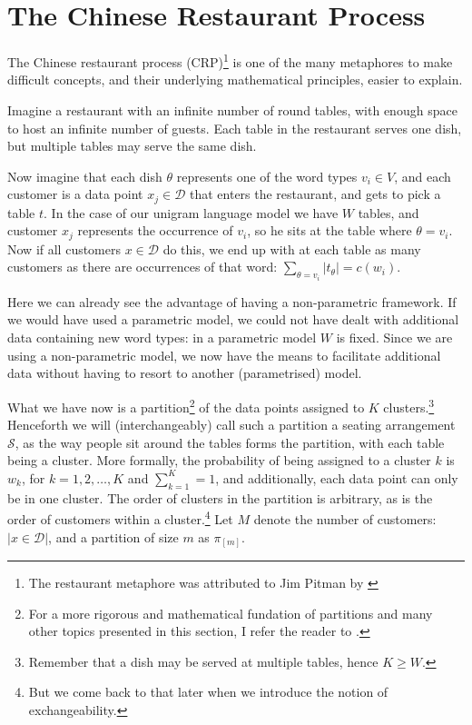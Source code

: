 \section{The Chinese Restaurant Process}
The Chinese restaurant process (CRP)\footnote{The restaurant metaphore was attributed to Jim Pitman by \cite{Aldous1985Exchangeability}} is one of the many metaphores to make difficult concepts, and their underlying mathematical principles, easier to explain. 

Imagine a restaurant with an infinite number of round tables, with enough space to host an infinite number of guests. Each table in the restaurant serves one dish, but multiple tables may serve the same dish.

Now imagine that each dish $\theta$ represents one of the word types $v_i \in V$, and each customer is a data point $x_j\in\mathcal{D}$ that enters the restaurant, and gets to pick a table $t$. In the case of our unigram language model we have $W$ tables, and customer $x_j$ represents the occurrence of $v_i$, so he sits at the table where $\theta = 
v_i$. Now if all customers $x\in\mathcal{D}$ do this, we end up with at each table as many customers as there are occurrences of that word: $\sum_{\theta=v_i}|t_{\theta}| = c(w_i)$.

Here we can already see the advantage of having a non-parametric framework. If we would have used a parametric model, we could not have dealt with additional data containing new word types: in a parametric model $W$ is fixed. Since we are using a non-parametric model, we now have the means to facilitate additional data without having to resort to another (parametrised) model.

What we have now is a partition\footnote{For a more rigorous and mathematical fundation of partitions and many other topics presented in this section, I refer the reader to \cite{Pitman2006Combinatorial}.} of the data points assigned to $K$ clusters.\footnote{Remember that a dish may be served at multiple tables, hence $K\geq W$.} Henceforth we will (interchangeably) call such a partition a seating arrangement $\mathcal{S}$, as the way people sit around the tables forms the partition, with each table being a cluster. More formally, the probability of being assigned to a cluster $k$ is $w_k$, for $k = 1, 2, \ldots, K$ and $\sum_{k=1}^K = 1$, and additionally, each data point can only be in one cluster. The order of clusters in the partition is arbitrary, as is the order of customers within a cluster.\footnote{But we come back to that later when we introduce the notion of exchangeability.} Let $M$ denote the number of customers: $|x\in\mathcal{D}|$, and a partition of size $m$ as $\pi_{[m]}$. 

